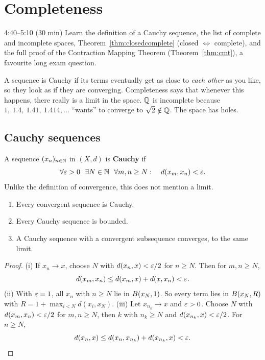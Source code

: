 \chapter{Completeness}\label{ch:4}
\begin{studyslot}{4:40--5:10 (30 min)}
Learn the definition of a Cauchy sequence, the list of complete and incomplete spaces, Theorem~\ref{thm:closedcomplete} (closed $\iff$ complete), and the full proof of the Contraction Mapping Theorem (Theorem~\ref{thm:cmt}), a favourite long exam question.
\end{studyslot}

\begin{intuition}
A sequence is Cauchy if its terms eventually get as close to \emph{each other} as you like, so they look as if they are converging. Completeness says that whenever this happens, there really is a limit in the space. $\mathbb{Q}$ is incomplete because $1,\ 1.4,\ 1.41,\ 1.414,\dots$ ``wants'' to converge to $\sqrt2\notin\mathbb{Q}$. The space has holes.
\end{intuition}

\section{Cauchy sequences}
\begin{definition}\label{def:cauchy}
A sequence $(x_n)_{n\in\mathbb{N}}$ in $(X,d)$ is \textbf{Cauchy} if
\[
  \forall\varepsilon>0\ \ \exists N\in\mathbb{N}\ \ \forall m,n\ge N:\quad d(x_m,x_n)<\varepsilon .
\]
Unlike the definition of convergence, this does not mention a limit.
\end{definition}

\begin{proposition}\label{prop:cauchyfacts}
\leavevmode
\begin{enumerate}[label=(\roman*)]
  \item Every convergent sequence is Cauchy.
  \item Every Cauchy sequence is bounded.
  \item A Cauchy sequence with a convergent subsequence converges, to the same limit.
\end{enumerate}
\end{proposition}
\begin{proof}
(i) If $x_n\to x$, choose $N$ with $d(x_n,x)<\varepsilon/2$ for $n\ge N$. Then for $m,n\ge N$,
\[ d(x_m,x_n)\le d(x_m,x)+d(x,x_n)<\varepsilon . \]
(ii) With $\varepsilon=1$, all $x_n$ with $n\ge N$ lie in $B(x_N,1)$. So every term lies in $B(x_N,R)$ with $R=1+\max_{i<N}d(x_i,x_N)$.
(iii) Let $x_{n_k}\to x$ and $\varepsilon>0$. Choose $N$ with $d(x_m,x_n)<\varepsilon/2$ for $m,n\ge N$, then $k$ with $n_k\ge N$ and $d(x_{n_k},x)<\varepsilon/2$. For $n\ge N$,
\[ d(x_n,x)\le d(x_n,x_{n_k})+d(x_{n_k},x)<\varepsilon. \qedhere \]
\end{proof}

